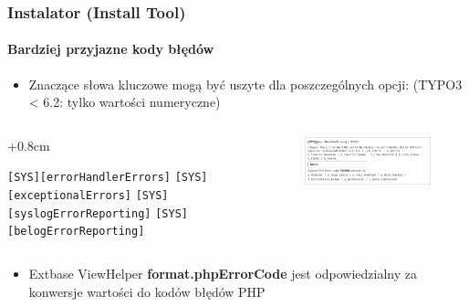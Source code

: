 
\begin{frame}[fragile]
	\frametitle{Instalator (Install Tool)}
	\framesubtitle{Bardziej przyjazne kody błędów}

	\begin{itemize}
		\item Znaczące słowa kluczowe mogą być uszyte dla poszczególnych opcji:\newline
			(TYPO3 < 6.2: tylko wartości numeryczne)
	\end{itemize}

	\begin{columns}[T]
		\begin{column}{.4\textwidth}
			\advance\leftskip+0.8cm

			\smaller
				\texttt{[SYS][errorHandlerErrors]}\newline
				\texttt{[SYS][exceptionalErrors]}\newline
				\texttt{[SYS][syslogErrorReporting]}\newline
				\texttt{[SYS][belogErrorReporting]}\newline
			\normalsize

		\end{column}
		\begin{column}{.6\textwidth}

			\begin{figure}\vspace*{-0.4cm}
				\includegraphics[width=0.9\linewidth]{Images/InstallTool/HumanFriendlyErrorCodes.png}
			\end{figure}

		\end{column}
	\end{columns}

	\vspace{0.2cm}

	\begin{itemize}
		\item Extbase ViewHelper \textbf{format.phpErrorCode} jest odpowiedzialny za konwersje wartości do kodów błędów PHP
	\end{itemize}

\end{frame}

